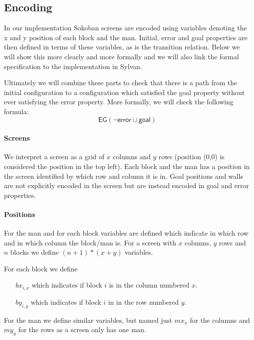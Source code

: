 \subsection{Encoding} \label{seq:encoding}
In our implementation Sokoban screens are encoded using variables denoting the
x and y position of each block and the man. Initial, error and goal properties
are then defined in terms of these variables, as is the transition relation. 
Below we will show this more 
clearly and more formally and we will also link the formal specification to the
implementation in Sylvan.

Ultimately we will combine these parts to check that there is a path from the
initial configuration to a configuration which satisfied the goal property 
without ever satisfying the error property. More formally, we will check the
following formula:
\begin{equation}\label{eq:eg_end}
	\mathsf{EG (\neg error \cup goal)}
\end{equation}

\paragraph{Screens} We interpret a screen as a grid of $x$ columns and $y$ rows
(position (0,0) is considered the position in the top left).
Each block and the man has a position in the screen identified by which row and
column it is in. Goal positions and walls are not explicitly encoded in the 
screen but are instead encoded in goal and error properties.

\paragraph{Positions} For the man and for each block variables are defined which
indicate in which row and in which column the block/man is. For a screen with
$x$ columns, $y$ rows and $n$ blocks we define $(n+1)*(x+y)$ 
variables. 

For each block we define
\begin{itemize}
	\item[$bx_{i,x}$] which indicates if block $i$ is in the column numbered $x$.
	\item[$by_{i,y}$] which indicates if block $i$ in in the row numbered $y$.
\end{itemize}
For the man we define similar variables, but named just $mx_x$ for the columns
and $my_y$ for the rows as a screen only has one man.

